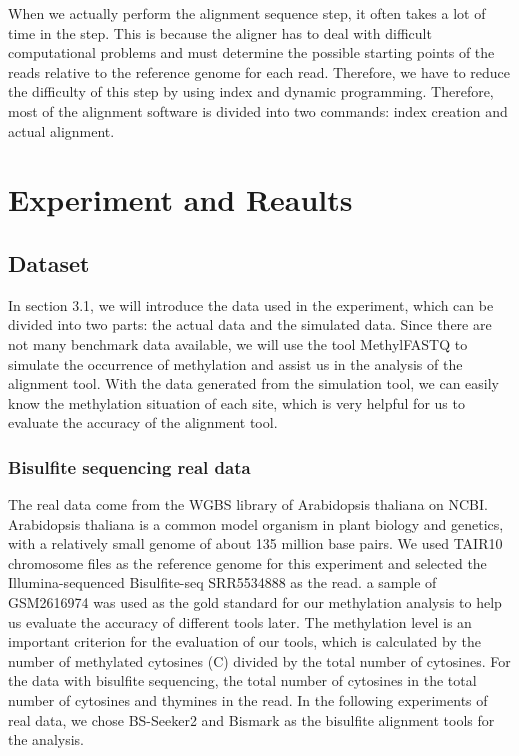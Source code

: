 \documentclass{PHlab-thesis}
\begin{document}
\par
When we actually perform the alignment sequence step, it often takes a lot of time in the step. This is because the aligner has to deal with difficult computational problems and must determine the possible starting points of the reads relative to the reference genome for each read. Therefore, we have to reduce the difficulty of this step by using index and dynamic programming. Therefore, most of the alignment software is divided into two commands: index creation and actual alignment.

\chapter{Experiment and Reaults}
\section{Dataset}
In section 3.1, we will introduce the data used in the experiment, which can be divided into two parts: the actual data and the simulated data. Since there are not many benchmark data available, we will use the tool MethylFASTQ to simulate the occurrence of methylation and assist us in the analysis of the alignment tool. With the data generated from the simulation tool, we can easily know the methylation situation of each site, which is very helpful for us to evaluate the accuracy of the alignment tool.

\subsection{Bisulfite sequencing real data}
The real data come from the WGBS library of Arabidopsis thaliana on NCBI. Arabidopsis thaliana is a common model organism in plant biology and genetics, with a relatively small genome of about 135 million base pairs. We used TAIR10 chromosome files as the reference genome for this experiment and selected the Illumina-sequenced Bisulfite-seq SRR5534888 as the read. a sample of GSM2616974 was used as the gold standard for our methylation analysis to help us evaluate the accuracy of different tools later. The methylation level is an important criterion for the evaluation of our tools, which is calculated by the number of methylated cytosines (C) divided by the total number of cytosines. For the data with bisulfite sequencing, the total number of cytosines in the total number of cytosines and thymines in the read. In the following experiments of real data, we chose BS-Seeker2 and Bismark as the bisulfite alignment tools for the analysis.
\end{document}

